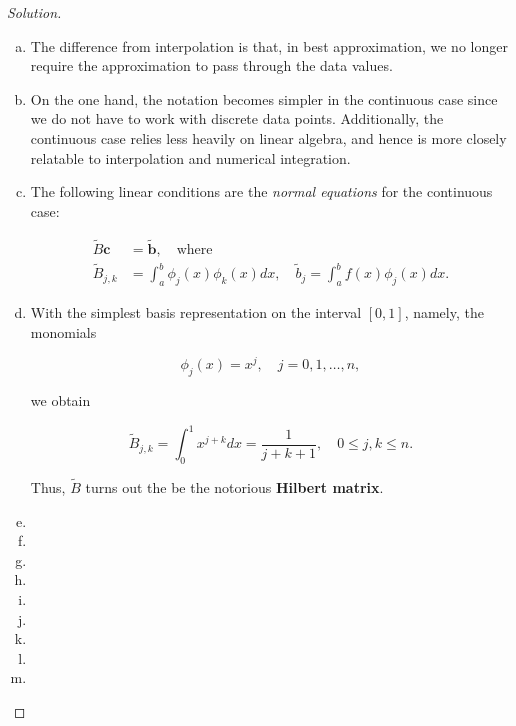 \documentclass[12pt,a4]{article}
\theoremstyle{definition}
\begin{document}
\begin{proof}[Solution]
	\begin{enumerate}[(a)]
		\item The difference from interpolation is that, in best approximation, we no longer require the approximation to pass through the data values. 
		
		\item On the one hand, the notation becomes simpler in the continuous case since we do not have to work with discrete data points. Additionally, the continuous case relies less heavily on linear algebra, and hence is more closely relatable to interpolation and numerical integration.
		
		\item The following linear conditions are the \emph{normal equations} for the continuous case:
		
		\begin{align*}
		\tilde{B} \mathbf{c} &= \tilde{\mathbf{b}} {,} \quad \text{where} \\
		\tilde{B}_{j, k} &= \int_a^b \phi_j(x) \phi_k(x) dx {,} \quad \tilde{b}_j = \int_a^b f(x) \phi_j(x) dx {.}
		\end{align*}
		
		\item With the simplest basis representation on the interval $[0, 1]$, namely, the monomials
		
		\[
		\phi_j(x) = x^j {,} \quad j = 0, 1, \ldots, n {,} 
		\]
		
		\noindent we obtain
		
		\[
		\tilde{B}_{j, k} = \int_0^1 x^{j + k} dx = \frac{1}{j + k + 1} {,} \quad 0 \leq j, k \leq n {.}
		\]
		
		\noindent Thus, $\tilde{B}$ turns out the be the notorious \textbf{Hilbert matrix}. 
		
		\item 
		
		\item 
		
		\item 
		
		\item 
		
		\item 
		
		\item 
		
		\item 
		
		\item 
		
		\item 
	\end{enumerate}
\end{proof}
\end{document}
